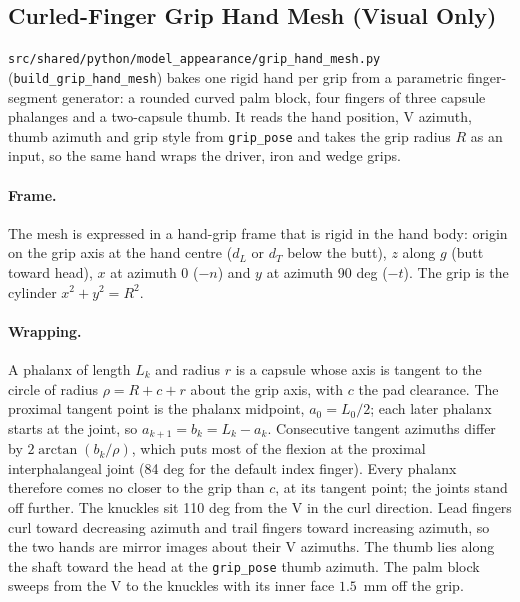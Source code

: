 \documentclass[11pt,a4paper]{article}
\begin{document}
\subsection{Curled-Finger Grip Hand Mesh (Visual Only)}
\texttt{src/shared/python/model\_appearance/grip\_hand\_mesh.py}
(\texttt{build\_grip\_hand\_mesh}) bakes one rigid hand per grip from a
parametric finger-segment generator: a rounded curved palm block, four
fingers of three capsule phalanges and a two-capsule thumb. It reads the hand
position, V azimuth, thumb azimuth and grip style from \texttt{grip\_pose}
and takes the grip radius $R$ as an input, so the same hand wraps the driver,
iron and wedge grips.

\paragraph{Frame.} The mesh is expressed in a hand-grip frame that is rigid in
the hand body: origin on the grip axis at the hand centre ($d_L$ or $d_T$
below the butt), $z$ along $g$ (butt toward head), $x$ at azimuth $0$ ($-n$)
and $y$ at azimuth 90 deg ($-t$). The grip is the cylinder $x^2+y^2=R^2$.

\paragraph{Wrapping.} A phalanx of length $L_k$ and radius $r$ is a capsule
whose axis is tangent to the circle of radius $\rho=R+c+r$ about the grip axis,
with $c$ the pad clearance. The proximal tangent point is the phalanx
midpoint, $a_0=L_0/2$; each later phalanx starts at the joint, so
$a_{k+1}=b_k=L_k-a_k$. Consecutive tangent azimuths differ by
$2\arctan(b_k/\rho)$, which puts most of the flexion at the proximal
interphalangeal joint (84 deg for the default index finger). Every phalanx
therefore comes no closer to the grip than $c$, at its tangent point; the
joints stand off further. The knuckles sit 110 deg from the V in the curl
direction. Lead fingers curl toward decreasing azimuth and trail fingers
toward increasing azimuth, so the two hands are mirror images about their V
azimuths. The thumb lies along the shaft toward the head at the
\texttt{grip\_pose} thumb azimuth. The palm block sweeps from the V to the
knuckles with its inner face $1.5$~mm off the grip.
\end{document}
